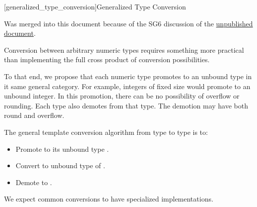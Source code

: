 
\begin{addedblock}
[generalized_type_conversion]{Generalized Type Conversion}

\begin{reviewnote}
Was merged into this document because of the SG6 discussion of the \href{http://wiki.edg.com/pub/Wg21cologne2019/SG6/specification.html}{unpublished document}.
\end{reviewnote}

Conversion between arbitrary numeric types requires something more practical than implementing the full cross product of conversion possibilities.

To that end, we propose that each numeric type promotes to an unbound type in it same general category. For example, integers of fixed size would promote to an unbound integer. In this promotion, there can be no possibility of overflow or rounding. Each type also demotes from that type. The demotion may have both round and overflow.

The general template conversion algorithm from type  to type  is to:

\begin{itemize}
\item Promote  to its unbound type .
\item Convert  to unbound type  of .
\item Demote  to .
\end{itemize}

We expect common conversions to have specialized implementations.

\end{addedblock}
